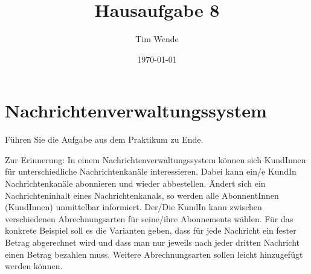 \documentclass{article}
\author{Tim Wende}
\date{\today}
\title{\textbf{Hausaufgabe 8}}
\begin{document}
    \maketitle

    \section*{Nachrichtenverwaltungssystem}

    Führen Sie die Aufgabe aus dem Praktikum zu Ende.

    Zur Erinnerung:
    In einem Nachrichtenverwaltungssystem können sich KundInnen für unterschiedliche Nachrichtenkanäle interessieren.
    Dabei kann ein/e KundIn Nachrichtenkanäle abonnieren und wieder abbestellen.
    Ändert sich ein Nachrichteninhalt eines Nachrichtenkanals, so werden alle AbonnentInnen (KundInnen) unmittelbar informiert.
    Der/Die KundIn kann zwischen verschiedenen Abrechnungsarten für seine/ihre Abonnements wählen.
    Für das konkrete Beispiel soll es die Varianten geben, dass für jede Nachricht ein fester Betrag abgerechnet wird und dass man nur jeweils nach jeder dritten Nachricht einen Betrag bezahlen muss.
    Weitere Abrechnungsarten sollen leicht hinzugefügt werden können.
\end{document}
